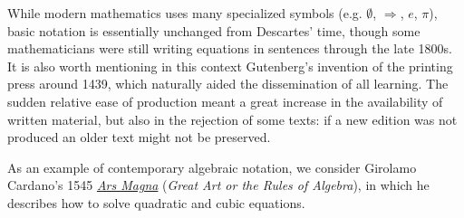 While modern mathematics uses many specialized symbols (e.g.{} $\emptyset$, $\Rightarrow$, $e$, $\pi$), basic notation is essentially unchanged from Descartes' time, though some mathematicians were still writing equations in sentences through the late 1800s. %
It is also worth mentioning in this context Gutenberg's invention of the printing press around 1439, which naturally aided the dissemination of all learning. The sudden relative ease of production meant a great increase in the availability of written material, but also in the rejection of some texts: if a new edition was not produced an older text might not be preserved.




As an example of contemporary algebraic notation, we consider Girolamo Cardano's 1545 \href{http://math.uci.edu/~ndonalds/math184/cardano.pdf}{\emph{Ars Magna}} (\emph{Great Art or the Rules of Algebra}), in which he describes how to solve quadratic and cubic equations.\par

